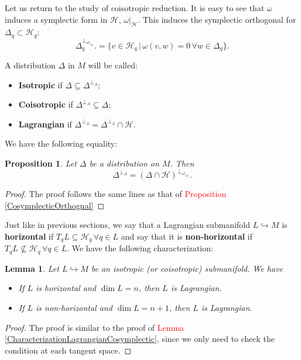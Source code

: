\documentclass[12pt]{article}
\newtheorem{prop}{Proposition}[section]
\newtheorem{lemma}{Lemma}[section]
\renewcommand{\dim}{\operatorname{dim}}
\begin{document}
Let us return to the study of coisotropic reduction. It is easy to see that $\omega$ induces a symplectic form in $\mathcal{H}$, $\omega|_\mathcal{H}$. This induces the symplectic orthogonal for $\Delta_q \subset \mathcal{H}_q$: $$\Delta_q^{\perp_{\omega|_\mathcal{H}}} .= \{v \in \mathcal{H}_q\,| \, \omega(v,w) = 0 \,\forall w \in \Delta_q\}.$$

A distribution $\Delta$ in $M$ will be called:
\begin{itemize}
\item[i)] \textbf{Isotropic} if $\Delta \subseteq \Delta^{\perp_\Lambda};$
\item[ii)] \textbf{Coisotropic} if $\Delta^{\perp_\Lambda} \subseteq \Delta;$
\item[iii)] \textbf{Lagrangian} if $\Delta^{\perp_\Lambda} = \Delta^{\perp_\Lambda} \cap \mathcal{H}.$
\end{itemize}

We have the following equality:\\

\begin{prop} Let $\Delta$ be a distribution on $M$. Then $$\Delta^{\perp_\Lambda} = (\Delta \cap \mathcal{H})^{\perp_{\omega|_\mathcal{H}}}.$$
\end{prop}
\begin{proof} The proof follows the same lines as that of \textcolor{red}{Proposition \ref{CosymplecticOrthognal}}
\end{proof}

Just like in previous sections, we say that a Lagrangian submanifold $L \hookrightarrow M$ is \textbf{horizontal} if $T_qL \subseteq \mathcal{H}_q\, \forall q \in L$ and say that it is \textbf{non-horizontal} if $T_qL \not \subseteq  \mathcal{H}_q \, \forall q \in L.$ We have the following characterization:\\

\begin{lemma} Let $L \hookrightarrow M$ be an isotropic (or coisotropic) submanifold. We have
\begin{itemize}
\item[i)] If $L$ is horizontal and $\dim L = n$, then $L$ is Lagrangian.
\item[ii)] If $L$ is non-horizontal and $\dim L = n+1$, then $L$ is Lagrangian.
\end{itemize}
\end{lemma}
\begin{proof} The proof is similar to the proof of \textcolor{red}{Lemma \ref{CharacterizationLagrangianCosymplectic}}, since we only need to check the condition at each tangent space.
\end{proof}
\end{document}
